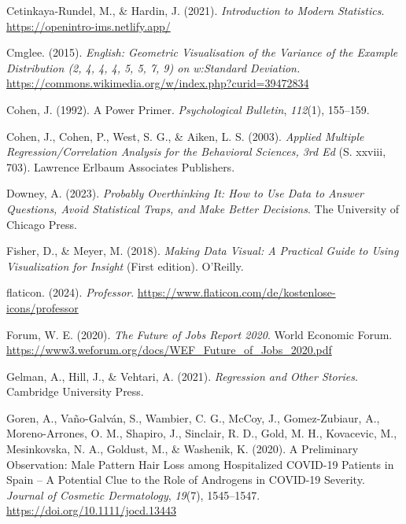 \documentclass[
  letterpaper,
]{scrbook}
\newlength{\cslhangindent}
\newenvironment{CSLReferences}[2] %
 {\begin{list}{}{%
  \setlength{\itemindent}{0pt}
  \setlength{\leftmargin}{0pt}
  \setlength{\parsep}{0pt}
  \ifodd #1
   \setlength{\leftmargin}{\cslhangindent}
   \setlength{\itemindent}{-1\cslhangindent}
  \fi
  \setlength{\itemsep}{#2\baselineskip}}}
 {\end{list}}
\theoremstyle{definition}
\theoremstyle{definition}
\theoremstyle{definition}
\theoremstyle{remark}
\begin{document}
\begin{CSLReferences}{1}{0}
Cetinkaya-Rundel, M., \& Hardin, J. (2021). \emph{Introduction to
{Modern Statistics}}. \url{https://openintro-ims.netlify.app/}

Cmglee. (2015). \emph{English: {Geometric} Visualisation of the Variance
of the Example Distribution (2, 4, 4, 4, 5, 5, 7, 9) on w:{Standard}
Deviation.}
\url{https://commons.wikimedia.org/w/index.php?curid=39472834}

Cohen, J. (1992). A Power Primer. \emph{Psychological Bulletin},
\emph{112}(1), 155--159.

Cohen, J., Cohen, P., West, S. G., \& Aiken, L. S. (2003). \emph{Applied
Multiple Regression/Correlation Analysis for the Behavioral Sciences,
3rd Ed} (S. xxviii, 703). Lawrence Erlbaum Associates Publishers.

Downey, A. (2023). \emph{Probably Overthinking It: How to Use Data to
Answer Questions, Avoid Statistical Traps, and Make Better Decisions}.
The University of Chicago Press.

Fisher, D., \& Meyer, M. (2018). \emph{Making Data Visual: A Practical
Guide to Using Visualization for Insight} (First edition). O'Reilly.

flaticon. (2024). \emph{Professor}.
\url{https://www.flaticon.com/de/kostenlose-icons/professor}

Forum, W. E. (2020). \emph{The {Future} of {Jobs Report} 2020}. World
Economic Forum.
\url{https://www3.weforum.org/docs/WEF_Future_of_Jobs_2020.pdf}

Gelman, A., Hill, J., \& Vehtari, A. (2021). \emph{Regression and Other
Stories}. Cambridge University Press.

Goren, A., Vaño-Galván, S., Wambier, C. G., McCoy, J., Gomez-Zubiaur,
A., Moreno-Arrones, O. M., Shapiro, J., Sinclair, R. D., Gold, M. H.,
Kovacevic, M., Mesinkovska, N. A., Goldust, M., \& Washenik, K. (2020).
A Preliminary Observation: {Male} Pattern Hair Loss among Hospitalized
{COVID-19} Patients in {Spain} -- {A} Potential Clue to the Role of
Androgens in {COVID-19} Severity. \emph{Journal of Cosmetic
Dermatology}, \emph{19}(7), 1545--1547.
\url{https://doi.org/10.1111/jocd.13443}


\end{CSLReferences}
\end{document}
